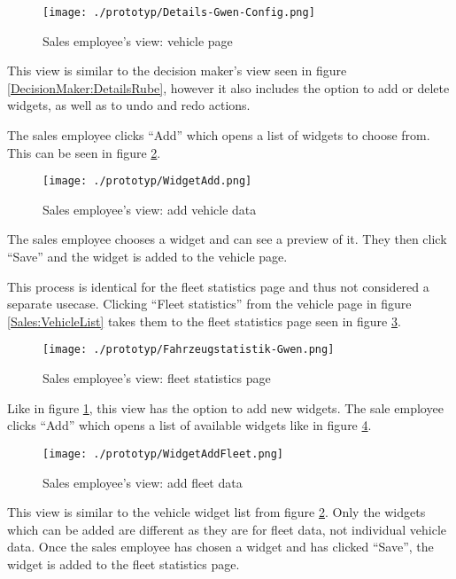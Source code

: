 \begin{figure}[ht]
  \centering
  \texttt{[image: ./prototyp/Details-Gwen-Config.png]}
  \caption{Sales employee's view: vehicle page}
  \label{Sales:VehicleInformation}
\end{figure}

This view is similar to the decision maker's view seen in figure \ref{DecisionMaker:DetailsRube}, however it also includes the option to add or delete \glspl{widget}, as well as to undo and redo actions.

The sales employee clicks \enquote{Add} which opens a list of \glspl{widget} to choose from. This can be seen in figure \ref{Sales:AddWidget}.

\begin{figure}[ht]
  \centering
  \texttt{[image: ./prototyp/WidgetAdd.png]}
  \caption{Sales employee's view: add vehicle \gls{data}}
  \label{Sales:AddWidget}
\end{figure}

The sales employee chooses a \gls{widget} and can see a preview of it. They then click \enquote{Save} and the \gls{widget} is added to the vehicle page.

This process is identical for the fleet statistics page and thus not considered a separate \gls{usecase}. Clicking \enquote{Fleet statistics} from the vehicle page in figure \ref{Sales:VehicleList} takes them to the fleet statistics page seen in figure \ref{Sales:Fleet}.

\begin{figure}[ht]
  \centering
  \texttt{[image: ./prototyp/Fahrzeugstatistik-Gwen.png]}
  \caption{Sales employee's view: fleet statistics page}
  \label{Sales:Fleet}
\end{figure}

Like in figure \ref{Sales:VehicleInformation}, this view has the option to add new \glspl{widget}. The sale employee clicks \enquote{Add} which opens a list of available \glspl{widget} like in figure \ref{Sales:FleetWidget}.

\begin{figure}[ht]
  \centering
  \texttt{[image: ./prototyp/WidgetAddFleet.png]}
  \caption{Sales employee's view: add fleet \gls{data}}
  \label{Sales:FleetWidget}
\end{figure}

This view is similar to the vehicle \gls{widget} list from figure \ref{Sales:AddWidget}. Only the \glspl{widget} which can be added are different as they are for fleet data, not individual vehicle data. Once the sales employee has chosen a \gls{widget} and has clicked \enquote{Save}, the \gls{widget} is added to the fleet statistics page.


